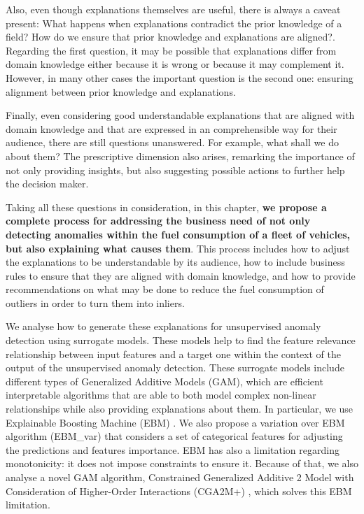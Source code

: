 Also, even though explanations themselves are useful, there is always a caveat present: What happens when explanations contradict the prior knowledge of a field? How do we ensure that prior knowledge and explanations are aligned?. Regarding the first question, it may be possible that explanations differ from domain knowledge either because it is wrong or because it may complement it. However, in many other cases the important question is the second one: ensuring alignment between prior knowledge and explanations.

Finally, even considering good understandable explanations that are aligned with domain knowledge and that are expressed in an comprehensible way for their audience, there are still questions unanswered. For example, what shall we do about them? The prescriptive dimension also arises, remarking the importance of not only providing insights, but also suggesting possible actions to further help the decision maker.

Taking all these questions in consideration, in this chapter, \textbf{we propose a complete process for addressing the business need of not only detecting anomalies within the fuel consumption of a fleet of vehicles, but also explaining what causes them}. This process includes how to adjust the explanations to be understandable by its audience, how to include business rules to ensure that they are aligned with domain knowledge, and how to provide recommendations on what may be done to reduce the fuel consumption of outliers in order to turn them into inliers. 

We analyse how to generate these explanations for unsupervised anomaly detection using surrogate models. These models help to find the feature relevance relationship between input features and a target one within the context of the output of the unsupervised anomaly detection.
These surrogate models include different types of Generalized Additive Models (GAM), which are efficient interpretable algorithms that are able to both model complex non-linear relationships while also providing explanations about them. In particular, we use Explainable Boosting Machine (EBM) \parencite{nori2019interpretml}. We also propose a variation over EBM algorithm (EBM\_var) that considers a set of categorical features for adjusting the predictions and features importance. EBM has also a limitation regarding monotonicity: it does not impose constraints to ensure it. Because of that, we also analyse a novel GAM algorithm, Constrained Generalized Additive 2 Model with Consideration of Higher-Order Interactions (CGA2M+) \parencite{watanabe2021cga2mplus}, which solves this EBM limitation.

